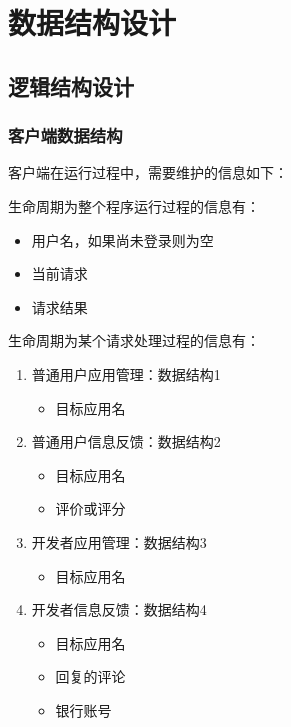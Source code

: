 \chapter{数据结构设计}
\section{逻辑结构设计}
\subsection{客户端数据结构}
客户端在运行过程中，需要维护的信息如下：

生命周期为整个程序运行过程的信息有：

\begin{itemize}
    \item 用户名，如果尚未登录则为空
    \item 当前请求
    \item 请求结果
\end{itemize}

生命周期为某个请求处理过程的信息有：

\begin{enumerate}
    \item 普通用户应用管理：数据结构1\\
        \begin{itemize}
            \item 目标应用名
        \end{itemize}
    \item 普通用户信息反馈：数据结构2\\
        \begin{itemize}
            \item 目标应用名
            \item 评价或评分
        \end{itemize}
    \item 开发者应用管理：数据结构3\\
        \begin{itemize}
            \item 目标应用名
        \end{itemize}
    \item 开发者信息反馈：数据结构4\\
        \begin{itemize}
            \item 目标应用名
            \item 回复的评论
            \item 银行账号
        \end{itemize}
\end{enumerate}

